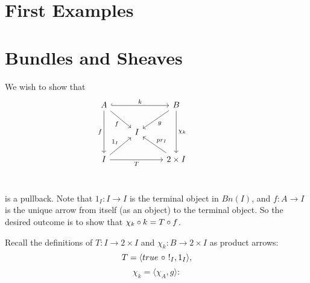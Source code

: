 \section{First Examples}

\section{Bundles and Sheaves}

    \begin{exercise}
        We wish to show that
        \[\begin{tikzcd}
            {A} && {B} \\
            & {I} \\
            {I} && {2 \times I} \\
            &&& {}
            \arrow["{k}", from=1-1, to=1-3, hook]
            \arrow["{f}"', from=1-1, to=2-2]
            \arrow["{g}", from=1-3, to=2-2]
            \arrow["{\chi_k}", from=1-3, to=3-3]
            \arrow["{T}"', from=3-1, to=3-3]
            \arrow["{1_I}", from=3-1, to=2-2]
            \arrow["{f}"', from=1-1, to=3-1]
            \arrow["{pr_I}"', from=3-3, to=2-2]
        \end{tikzcd}\]
        is a pullback.
        Note that $1_I : I \to I$ is the terminal object in $Bn(I)$, and $f : A \to I$ is the unique arrow from itself (as an object) to the terminal object. So the desired outcome is to show that $\chi_k \circ k = T \circ f$.

        Recall the definitions of $T : I \to 2 \times I$ and $\chi_k : B \to 2 \times I$ as product arrows:
        $$T = \langle true \ \o \ !_I, 1_I \rangle,$$
        $$\chi_k = \langle \chi_A, g \rangle:$$


\end{exercise}

